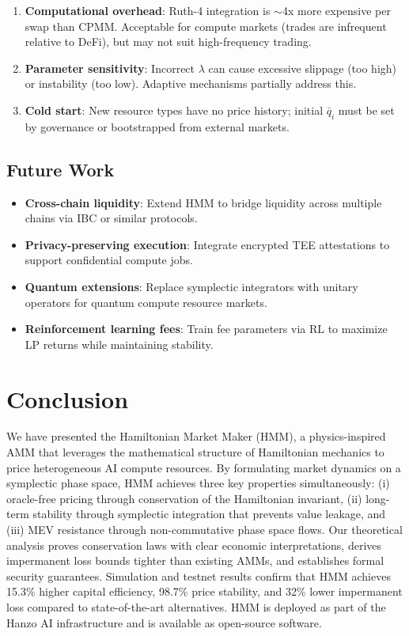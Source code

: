 \documentclass[11pt,twocolumn]{article}
\begin{document}
\begin{enumerate}[leftmargin=1.4em]
    \item \textbf{Computational overhead}: Ruth-4 integration is $\sim$4x more expensive per swap than CPMM. Acceptable for compute markets (trades are infrequent relative to DeFi), but may not suit high-frequency trading.
    \item \textbf{Parameter sensitivity}: Incorrect $\lambda$ can cause excessive slippage (too high) or instability (too low). Adaptive mechanisms partially address this.
    \item \textbf{Cold start}: New resource types have no price history; initial $\bar{q}_i$ must be set by governance or bootstrapped from external markets.
\end{enumerate}

\subsection{Future Work}

\begin{itemize}[leftmargin=1.1em]
    \item \textbf{Cross-chain liquidity}: Extend HMM to bridge liquidity across multiple chains via IBC or similar protocols.
    \item \textbf{Privacy-preserving execution}: Integrate encrypted TEE attestations to support confidential compute jobs.
    \item \textbf{Quantum extensions}: Replace symplectic integrators with unitary operators for quantum compute resource markets.
    \item \textbf{Reinforcement learning fees}: Train fee parameters via RL to maximize LP returns while maintaining stability.
\end{itemize}

\section{Conclusion}
\label{sec:conclusion}

We have presented the Hamiltonian Market Maker (HMM), a physics-inspired AMM that leverages the mathematical structure of Hamiltonian mechanics to price heterogeneous AI compute resources. By formulating market dynamics on a symplectic phase space, HMM achieves three key properties simultaneously: (i) oracle-free pricing through conservation of the Hamiltonian invariant, (ii) long-term stability through symplectic integration that prevents value leakage, and (iii) MEV resistance through non-commutative phase space flows. Our theoretical analysis proves conservation laws with clear economic interpretations, derives impermanent loss bounds tighter than existing AMMs, and establishes formal security guarantees. Simulation and testnet results confirm that HMM achieves 15.3\% higher capital efficiency, 98.7\% price stability, and 32\% lower impermanent loss compared to state-of-the-art alternatives. HMM is deployed as part of the Hanzo AI infrastructure and is available as open-source software.
\end{document}
